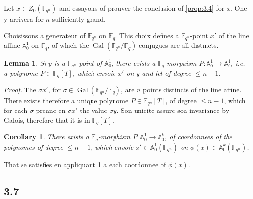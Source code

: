 \documentclass[11pt,a4paper]{article}
\theoremstyle{plain}
\newtheorem{lemma}[theorem]{Lemma}
\newtheorem{corollary}[theorem]{Corollary}
\theoremstyle{definition}
\DeclareMathOperator{\Gal}{Gal}
\begin{document}
Let $x \in Z_0(\mathbb{F}_{q^n})$ and essayons of prouver the conclusion of \ref{prop:3.4} for $x$. One y arrivera for $n$ sufficiently grand.

Choisissons a generateur of $\mathbb{F}_{q^n}$ on $\mathbb{F}_q$. This choix defines a $\mathbb{F}_{q^n}$-point $x'$ of the line affine $\mathbb{A}_0^1$ on $\mathbb{F}_q$, of which the $\Gal(\mathbb{F}_{q^n}/\mathbb{F}_q)$-conjugues are all distincts.

\begin{lemma}\label{lem:3.5}
Si $y$ is a $\mathbb{F}_{q^n}$-point of $\mathbb{A}_0^1$, there exists a $\mathbb{F}_q$-morphism $P: \mathbb{A}_0^1 \to \mathbb{A}_0^1$, i.e. a polynome $P \in \mathbb{F}_q[T]$, which envoie $x'$ on $y$ and let of degree $\leq n-1$.
\end{lemma}

\noindent\textit{Proof.} The $\sigma x'$, for $\sigma \in \Gal(\mathbb{F}_{q^n}/\mathbb{F}_q)$, are $n$ points distincts of the line affine. There exists therefore a unique polynome $P \in \mathbb{F}_{q^n}[T]$, of degree $\leq n-1$, which for each $\sigma$ prenne en $\sigma x'$ the value $\sigma y$. Son unicite assure son invariance by Galois, therefore that it is in $\mathbb{F}_q[T]$.

\begin{corollary}\label{cor:3.6}
There exists a $\mathbb{F}_q$-morphism $P: \mathbb{A}_0^1 \to \mathbb{A}_0^k$, of coordonnees of the polynomes of degree $\leq n-1$, which envoie $x' \in \mathbb{A}_0^1(\mathbb{F}_{q^n})$ on $\phi(x) \in \mathbb{A}_0^k(\mathbb{F}_{q^n})$.
\end{corollary}

That se satisfies en appliquant \ref{lem:3.5} a each coordonnee of $\phi(x)$.

\subsection{3.7}
\end{document}
